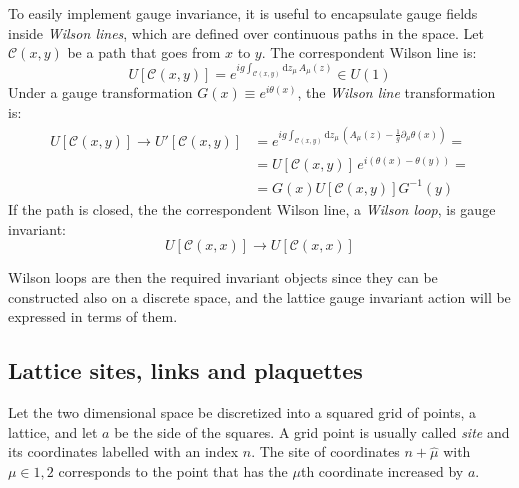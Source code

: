 To easily implement gauge invariance, it is useful to encapsulate gauge fields inside \emph{Wilson lines}, which are defined over continuous paths in the space.
Let $\mathcal C(x,y)$ be a path that goes from $x$ to $y$. The correspondent Wilson line is:
\[
    U[\mathcal C(x,y)] = e^{ig\int_{\mathcal C(x,y)}\mathrm dz_\mu\,A_\mu(z)} \in U(1)
\]
Under a gauge transformation $G(x) \equiv e^{i\theta(x)}$, the \emph{Wilson line} transformation is:
\begin{equation}\label{eq:path_gauge}
    \begin{aligned}
    U[\mathcal C(x,y)] \rightarrow U'[\mathcal C(x,y)] &= e^{ig\int_{\mathcal C(x,y)}\mathrm dz_\mu\,\left(A_\mu(z) - \frac{1}{g}\partial_\mu\theta(x)\right)} = \\
                                                       &= U[\mathcal C(x,y)]\,e^{i(\theta(x) - \theta(y))} = \\
                                                       &= G(x)U[\mathcal C(x,y)]G^{-1}(y)
    \end{aligned}
\end{equation}
If the path is closed, the the correspondent Wilson line, \ie a \emph{Wilson loop}, is gauge invariant:
\[
    U[\mathcal C(x,x)] \rightarrow U[\mathcal C(x,x)]
\]

Wilson loops are then the required invariant objects since they can be constructed also on a discrete space,
and the lattice gauge invariant action will be expressed in terms of them.

\subsection*{Lattice sites, links and plaquettes}
Let the two dimensional space be discretized into a squared grid of points, \ie a lattice, and let $a$ be the side of the squares.
A grid point is usually called \emph{site} and its coordinates labelled with an index $n$.
The site of coordinates $n + \hat\mu$ with $\mu \in {1,2}$ corresponds to the point that has the $\mu$th coordinate increased by $a$.

